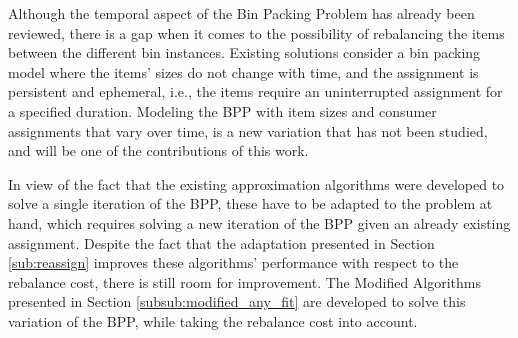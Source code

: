 Although the temporal aspect of the Bin Packing Problem has already been
reviewed, there is a gap when it comes to the possibility of rebalancing the
items between the different bin instances. Existing solutions consider a bin
packing model where the items' sizes do not change with time, and the assignment
is persistent and ephemeral, i.e., the items require an uninterrupted assignment
for a specified duration. Modeling the BPP with item sizes and consumer
assignments that vary over time, is a new variation that has not been studied,
and will be one of the contributions of this work. 

In view of the fact that the existing approximation algorithms were developed to
solve a single iteration of the BPP, these have to be adapted to the problem at
hand, which requires solving a new iteration of the BPP given an already
existing assignment. Despite the fact that the adaptation presented in Section
\ref{sub:reassign} improves these algorithms' performance with respect to the
rebalance cost, there is still room for improvement. The Modified Algorithms
presented in Section \ref{subsub:modified_any_fit} are developed to solve this
variation of the BPP, while taking the rebalance cost into account.



